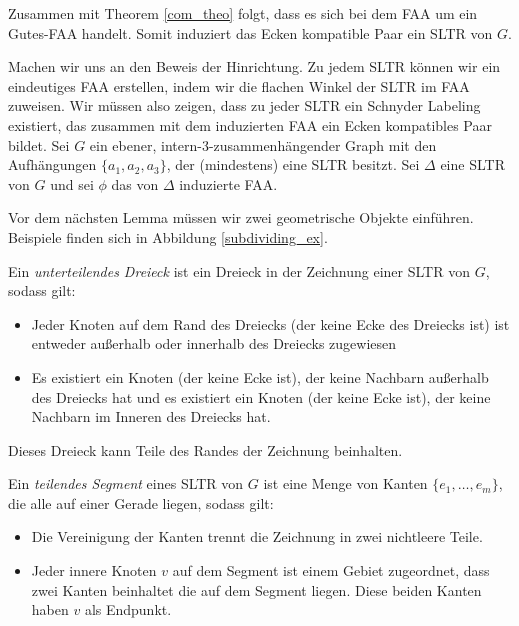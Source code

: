 Zusammen mit Theorem \ref{com_theo} folgt, dass es sich bei dem FAA um ein Gutes-FAA handelt. Somit induziert das Ecken kompatible Paar ein SLTR von $G$.

Machen wir uns an den Beweis der Hinrichtung. Zu jedem SLTR können wir ein eindeutiges FAA erstellen, indem wir die flachen Winkel der SLTR im FAA zuweisen. Wir müssen also zeigen, dass zu jeder SLTR ein Schnyder Labeling existiert, das zusammen mit dem induzierten FAA ein Ecken kompatibles Paar bildet. Sei $G$ ein ebener, intern-3-zusammenhängender Graph mit den Aufhängungen $\{a_1,a_2,a_3\}$, der (mindestens) eine SLTR besitzt. Sei $\Delta$ eine SLTR von $G$ und sei $\phi$ das von $\Delta$ induzierte FAA.

Vor dem nächsten Lemma müssen wir zwei geometrische Objekte einführen. Beispiele finden sich in Abbildung \ref{subdividing_ex}.

\begin{definition}
Ein \textit{unterteilendes Dreieck} ist ein Dreieck in der Zeichnung einer SLTR von $G$, sodass gilt:
\begin{itemize}
\item Jeder Knoten auf dem Rand des Dreiecks (der keine Ecke des Dreiecks ist) ist entweder außerhalb oder innerhalb des Dreiecks zugewiesen
\item Es existiert ein Knoten (der keine Ecke ist), der keine Nachbarn außerhalb des Dreiecks hat und es existiert ein Knoten (der keine Ecke ist), der keine Nachbarn im Inneren des Dreiecks hat.
\end{itemize}
Dieses Dreieck kann Teile des Randes der Zeichnung beinhalten.
\end{definition}

\begin{definition}
Ein \textit{teilendes Segment} eines SLTR von $G$ ist eine Menge von Kanten $\{e_1, \ldots , e_m\}$, die alle auf einer Gerade liegen, sodass gilt:
\begin{itemize}
\item Die Vereinigung der Kanten trennt die Zeichnung in zwei nichtleere Teile. 
\item Jeder innere Knoten $v$ auf dem Segment ist einem Gebiet zugeordnet, dass zwei Kanten beinhaltet die auf dem Segment liegen. Diese beiden Kanten haben $v$ als Endpunkt.
\end{itemize}
\end{definition}

